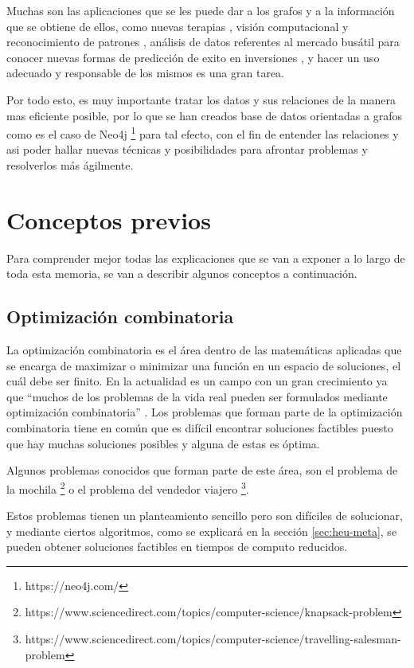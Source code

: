Muchas son las aplicaciones que se les puede dar a los grafos y a la información que se obtiene de ellos, como nuevas terapias \cite{top-molec}, visión computacional y reconocimiento de patrones \cite{mcp-compVision}, análisis de datos referentes al mercado busátil \cite{market-data} para conocer nuevas formas de predicción de exito en inversiones \cite{vid-graf-ai}, y hacer un uso adecuado y responsable de los mismos es una gran tarea.

Por todo esto, es muy importante tratar los datos y sus relaciones de la manera mas eficiente posible, por lo que se han creados base de datos orientadas a grafos como es el caso de Neo4j \footnote{https://neo4j.com/} para tal efecto, con el fin de entender las relaciones y asi poder hallar nuevas técnicas y posibilidades para afrontar problemas y resolverlos más ágilmente.


\section{Conceptos previos}
Para comprender mejor todas las explicaciones que se van a exponer a lo largo de toda esta memoria, se van a describir algunos conceptos a continuación.

\subsection{Optimización combinatoria}
La optimización combinatoria es el área dentro de las matemáticas aplicadas que se encarga de maximizar o minimizar una función en un espacio de soluciones, el cuál debe ser finito. En la actualidad es un campo con un gran crecimiento ya que ``muchos de los problemas de la vida real pueden ser formulados mediante optimización combinatoria'' \cite{opt-comb-rg}.
Los problemas que forman parte de la optimización combinatoria tiene en común que es difícil encontrar soluciones factibles puesto que hay muchas soluciones posibles y alguna de estas es óptima.

Algunos problemas conocidos que forman parte de este área, son el problema de la mochila \footnote{https://www.sciencedirect.com/topics/computer-science/knapsack-problem} o el problema del vendedor viajero \footnote{https://www.sciencedirect.com/topics/computer-science/travelling-salesman-problem}.

Estos problemas tienen un planteamiento sencillo pero son difíciles de solucionar, y mediante ciertos algoritmos, como se explicará en la sección \ref{sec:heu-meta}, se pueden obtener soluciones factibles en tiempos de computo reducidos.

